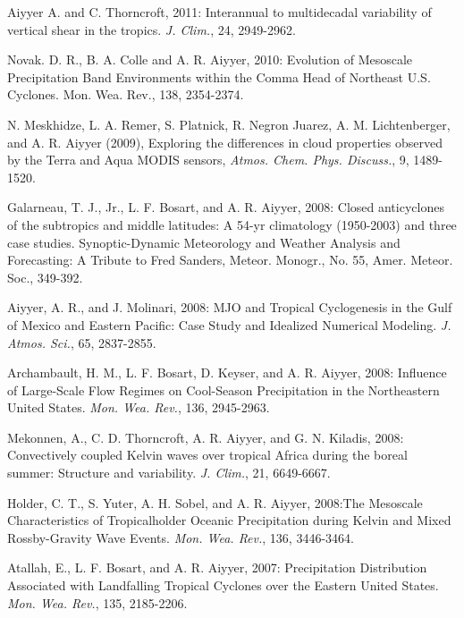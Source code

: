 \begin{ilist}
\item Aiyyer A. and C. Thorncroft, 2011: Interannual to multidecadal variability of vertical shear in the tropics. \emph{J. Clim.}, 24, 2949-2962.

\item Novak. D. R., B. A. Colle and A. R. Aiyyer, 2010: Evolution of Mesoscale Precipitation Band Environments within the Comma Head of Northeast U.S. Cyclones. Mon. Wea. Rev., 138, 2354-2374. 

\item N. Meskhidze, L. A. Remer, S. Platnick, R. Negron Juarez, A. M. Lichtenberger, and A. R. Aiyyer (2009), Exploring the differences in cloud properties observed by the Terra and Aqua MODIS sensors, \emph{Atmos. Chem. Phys. Discuss.}, 9, 1489-1520.

\item Galarneau, T. J., Jr., L. F. Bosart, and A. R. Aiyyer, 2008: Closed anticyclones of the subtropics and middle latitudes: A 54-yr climatology (1950-2003) and three case studies. Synoptic-Dynamic Meteorology and Weather Analysis and Forecasting: A Tribute to Fred Sanders, Meteor. Monogr., No. 55, Amer. Meteor. Soc., 349-392.

\item Aiyyer, A. R., and J. Molinari, 2008: MJO and Tropical Cyclogenesis in the Gulf of Mexico and Eastern Pacific: Case Study and Idealized Numerical Modeling. \emph{J. Atmos. Sci.}, 65, 2837-2855. 

\item Archambault, H. M., L. F. Bosart, D. Keyser, and A. R. Aiyyer, 2008: Influence of Large-Scale Flow Regimes on Cool-Season Precipitation in the Northeastern United States. \emph{Mon. Wea. Rev.}, 136, 2945-2963. 

\item Mekonnen, A., C. D. Thorncroft, A. R. Aiyyer, and G. N. Kiladis, 2008: Convectively coupled Kelvin waves over tropical Africa during the boreal summer: Structure and variability. \emph{J. Clim.}, 21, 6649-6667.

\item Holder, C. T., S. Yuter, A. H. Sobel, and A. R. Aiyyer, 2008:The Mesoscale Characteristics of Tropicalholder Oceanic Precipitation during Kelvin and Mixed Rossby-Gravity Wave Events. \emph{Mon. Wea. Rev.}, 136, 3446-3464. 

\item Atallah, E., L. F. Bosart, and A. R. Aiyyer, 2007: Precipitation Distribution Associated with Landfalling Tropical Cyclones over the Eastern United States. \emph{Mon. Wea. Rev.}, 135, 2185-2206.


\end{ilist}
